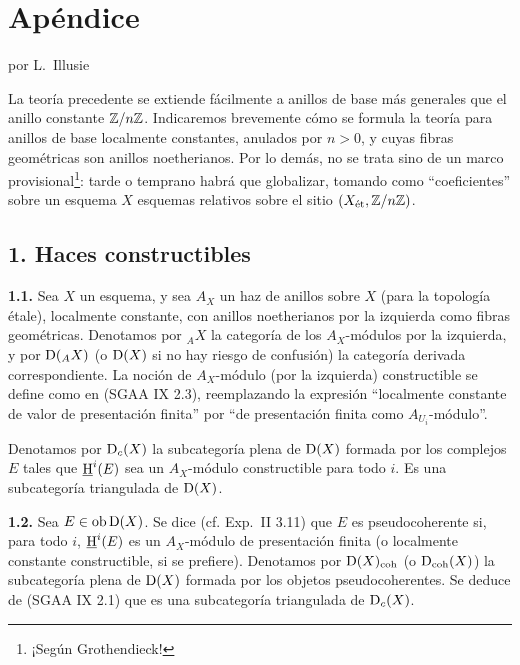 \section*{Apéndice}
\begin{center}
por L.~Illusie
\end{center}

La teoría precedente se extiende fácilmente a anillos de base más generales que el anillo constante $\mathbb{Z}/n\mathbb{Z}$. Indicaremos brevemente cómo se formula la teoría para anillos de base localmente constantes, anulados por $n>0$, y cuyas fibras geométricas son anillos noetherianos. Por lo demás, no se trata sino de un marco provisional\footnote{¡Según Grothendieck!}: tarde o temprano habrá que globalizar, tomando como ``coeficientes'' sobre un esquema $X$ esquemas relativos sobre el sitio $(X_{\mathrm{\acute et}},\mathbb{Z}/n\mathbb{Z})$.

\subsection*{1. Haces constructibles}

\textbf{1.1.} Sea $X$ un esquema, y sea $A_X$ un haz de anillos sobre $X$ (para la topología étale), localmente constante, con anillos noetherianos por la izquierda como fibras geométricas. Denotamos por ${}_A X$ la categoría de los $A_X$-módulos por la izquierda, y por $\mathrm{D}({}_A X)$ (o $\mathrm{D}(X)$ si no hay riesgo de confusión) la categoría derivada correspondiente. La noción de $A_X$-módulo (por la izquierda) constructible se define como en (SGAA IX 2.3), reemplazando la expresión ``localmente constante de valor de presentación finita'' por ``de presentación finita como $A_{U_i}$-módulo''.

Denotamos por $\mathrm{D}_c(X)$ la subcategoría plena de $\mathrm{D}(X)$ formada por los complejos $E$ tales que $\underline{\mathrm H}^i(E)$ sea un $A_X$-módulo constructible para todo $i$. Es una subcategoría triangulada de $\mathrm{D}(X)$.

\textbf{1.2.} Sea $E\in\operatorname{ob}\mathrm{D}(X)$. Se dice (cf. Exp.~II 3.11) que $E$ es pseudocoherente si, para todo $i$, $\underline{\mathrm H}^i(E)$ es un $A_X$-módulo de presentación finita (o localmente constante constructible, si se prefiere). Denotamos por $\mathrm{D}(X)_{\mathrm{coh}}$ (o $\mathrm{D}_{\mathrm{coh}}(X)$) la subcategoría plena de $\mathrm{D}(X)$ formada por los objetos pseudocoherentes. Se deduce de (SGAA IX 2.1) que es una subcategoría triangulada de $\mathrm{D}_c(X)$.

